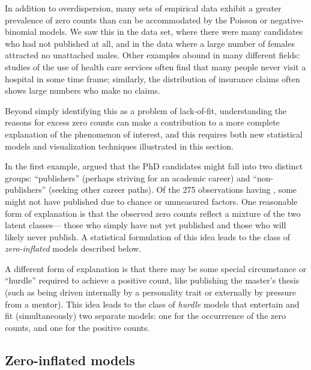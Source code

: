 \documentclass[11pt]{book}\usepackage[]{graphicx}\usepackage[]{color}
\begin{document}

In addition to overdispersion, many sets of empirical data exhibit a greater prevalence of
zero counts than can be accommodated by the Poisson or negative-binomial models.
We saw this in the  data set, where there were many candidates who had
not published at all, and in the  data where a large number of
females attracted no unattached males.
Other examples abound in many different fields: studies of the 
use of health care services often find that many people never visit a hospital
in some time frame; similarly, the distribution of insurance claims often shows
large numbers who make no claims.


Beyond simply identifying this as a problem of lack-of-fit,
understanding the reasons for excess zero counts can make a contribution to a
more complete explanation of the phenomenon of interest,
and this requires both new statistical models and visualization techniques
illustrated in this section.

In the first example, \citet{Long:1997} argued that the PhD candidates might fall into
two distinct groups: ``publishers'' (perhaps striving for an academic career)
and ``non-publishers'' (seeking other career paths).  Of the 275 observations
having , some might not have published due to chance or
unmeasured factors.  One reasonable form of explanation is that the observed
zero counts reflect a mixture of the two latent classes--- those who simply
have not yet published and those who will likely never publish.
A statistical formulation of this idea leads to the class of \emph{zero-inflated}
models described below.

A different form of explanation is that there may be some special 
circumstance or ``hurdle'' required to achieve a positive count,
like publishing the master's thesis
(such as being driven internally by a personality trait or externally by
pressure from a mentor). This idea leads to the class of \emph{hurdle} models
that entertain and fit (simultaneously) two separate models: one for the
occurrrence of the zero counts, and one for the positive counts.

\subsection{Zero-inflated models}\label{sec:glm-zip}
\end{document}
